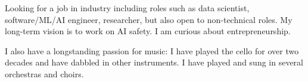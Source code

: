 Looking for a job in industry including roles such as data scientist, software/ML/AI engineer,
researcher, but also open to non-technical roles.
My long-term vision is to work on AI safety.
I am curious about entrepreneurship.


I also have a longstanding passion for music:
I have played the cello for over two decades and have dabbled in other instruments.
I have played and sung in several orchestras and choirs.
